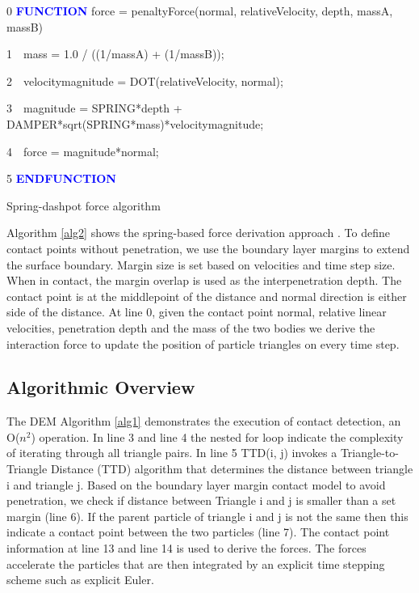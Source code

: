 \documentclass[times,12pt]{article}
\begin{document}
\begin{algorithm}	
  0 \textbf{\textcolor{blue}{FUNCTION}} force = penaltyForce(normal, relativeVelocity, depth, massA, massB)
  
  1~~mass = 1.0 / ((1/massA) + (1/massB));
  
  2~~velocitymagnitude = DOT(relativeVelocity, normal);
  
  3~~magnitude = SPRING*depth + DAMPER*sqrt(SPRING*mass)*velocitymagnitude;
  
  4~~force = magnitude*normal;
  
  5 \textbf{\textcolor{blue}{ENDFUNCTION}}
\protect\caption{\label{alg2}Spring-dashpot force algorithm}
\end{algorithm}

Algorithm \ref{alg2} shows the spring-based force derivation approach \cite{Koziara2008, solberg2000, Wachs2012, Williams1999}. To define contact points without penetration, we use the boundary layer margins to extend the surface boundary. Margin size is set based on velocities and time step size. When in contact, the margin overlap is used as the interpenetration depth. The contact point is at the middlepoint of the distance and normal direction is either side of the distance. At line 0, given the contact point normal, relative linear velocities, penetration depth and the mass of the two bodies we derive the interaction force to update the position of particle triangles on every time step.


\subsection{Algorithmic Overview}



The DEM Algorithm \ref{alg1} demonstrates the execution of contact detection, an O($n^2$) operation. In line 3 and line 4 the nested for loop indicate the complexity of iterating through all triangle pairs. In line 5 TTD(i, j) invokes a Triangle-to-Triangle Distance (TTD) algorithm that determines the distance between triangle i and triangle j. Based on the boundary layer margin contact model \cite{Krestenitis2015} to avoid penetration, we check if distance between Triangle i and j is smaller than a set margin (line 6). If the parent particle of triangle i and j is not the same then this indicate a contact point between the two particles (line 7). The contact point information at line 13 and line 14 is used to derive the forces. The forces accelerate the particles that are then integrated by an explicit time stepping scheme such as explicit Euler.
\end{document}
